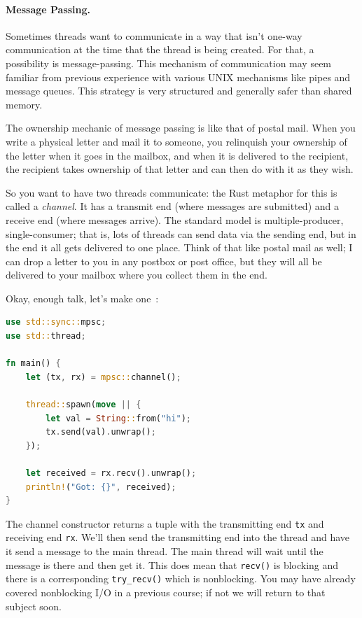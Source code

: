 \documentclass[a4paper]{report}
\begin{document}
\paragraph{Message Passing.} Sometimes threads want to communicate in a way that isn't one-way communication at the time that the thread is being created. For that, a possibility is message-passing. This mechanism of communication may seem familiar from previous experience with various UNIX mechanisms like pipes and message queues. This strategy is very structured and generally safer than shared memory. 

The ownership mechanic of message passing is like that of postal mail. When you write a physical letter and mail it to someone, you relinquish your ownership of the letter when it goes in the mailbox, and when it is delivered to the recipient, the recipient takes ownership of that letter and can then do with it as they wish.

So you want to have two threads communicate: the Rust metaphor for this is called a \textit{channel}. It has a transmit end (where messages are submitted) and a receive end (where messages arrive). The standard model is multiple-producer, single-consumer; that is, lots of threads can send data via the sending end, but in the end it all gets delivered to one place. Think of that like postal mail as well; I can drop a letter to you in any postbox or post office, but they will all be delivered to your mailbox where you collect them in the end.

Okay, enough talk, let's make one~\cite{rustdocs}:
\begin{lstlisting}[language=Rust]
use std::sync::mpsc;
use std::thread;

fn main() {
    let (tx, rx) = mpsc::channel();

    thread::spawn(move || {
        let val = String::from("hi");
        tx.send(val).unwrap();
    });

    let received = rx.recv().unwrap();
    println!("Got: {}", received);
}
\end{lstlisting}

The channel constructor returns a tuple with the transmitting end \texttt{tx} and receiving end \texttt{rx}. We'll then send the transmitting end into the thread and have it send a message to the main thread. The main thread will wait until the message is there and then get it. This does mean that \texttt{recv()} is blocking and there is a corresponding \texttt{try\_recv()} which is nonblocking. You may have already covered nonblocking I/O in a previous course; if not we will return to that subject soon.
\end{document}
